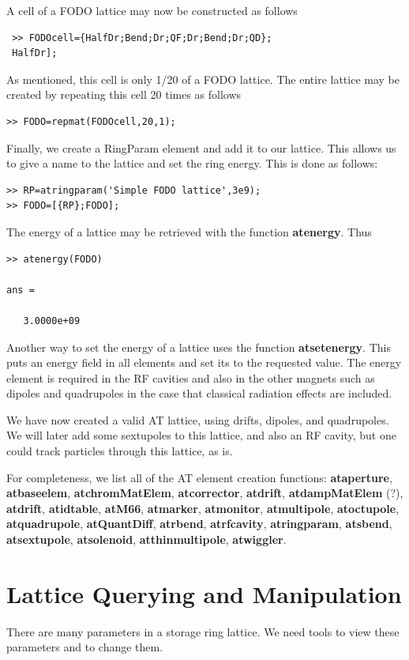 \documentclass[acus]{article}
\newcommand{\mfun}[1]{{\bf{#1}}}
\begin{document}
A cell of a FODO lattice may now be constructed as follows
 \begin{verbatim}
 >> FODOcell={HalfDr;Bend;Dr;QF;Dr;Bend;Dr;QD};
 HalfDr];
 \end{verbatim}

As mentioned, this cell is only 1/20 of a FODO lattice. The entire lattice may be created by repeating this cell 20 times as
follows
\begin{verbatim}
>> FODO=repmat(FODOcell,20,1);
\end{verbatim}

Finally, we create a RingParam element and add it to our lattice.  This allows us to give a name to
the lattice and set the ring energy.  This is done as follows:
\begin{verbatim}
>> RP=atringparam('Simple FODO lattice',3e9);
>> FODO=[{RP};FODO];
\end{verbatim}

The energy of a lattice may be retrieved with the function \mfun{atenergy}.  Thus
\begin{verbatim}
>> atenergy(FODO)

ans =

   3.0000e+09
\end{verbatim}
Another way to set the energy of a lattice uses the function \mfun{atsetenergy}.  This puts an 
energy field in all elements and set its to the requested value.  The energy element is required
in the RF cavities and also in the other magnets such as dipoles and quadrupoles in the case that
classical radiation effects are included.

We have now created a valid AT lattice, using drifts, dipoles, 
and quadrupoles.  We will later add some sextupoles to this lattice,
and also an RF cavity, but one could track particles through this lattice, as is.  

For completeness, we list all of the AT element creation functions:
\mfun{ataperture}, \mfun{atbaseelem}, \mfun{atchromMatElem}, \mfun{atcorrector},
\mfun{atdrift}, \mfun{atdampMatElem} (?), \mfun{atdrift}, \mfun{atidtable}, \mfun{atM66}, \mfun{atmarker}, \mfun{atmonitor},
\mfun{atmultipole}, \mfun{atoctupole}, \mfun{atquadrupole}, \mfun{atQuantDiff}, \mfun{atrbend},
\mfun{atrfcavity}, \mfun{atringparam}, \mfun{atsbend}, \mfun{atsextupole}, \mfun{atsolenoid},
\mfun{atthinmultipole}, \mfun{atwiggler}.


\section{Lattice Querying and Manipulation}\label{lattice_query_manip}
There are many parameters in a storage ring lattice.  We need tools to view these parameters and 
to change them.  
\end{document}
